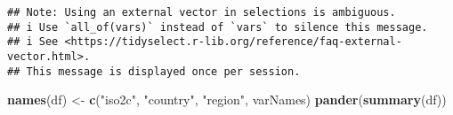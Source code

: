 \documentclass[
]{article}
\newenvironment{Shaded}{\begin{snugshade}}{\end{snugshade}}
\newcommand{\DataTypeTok}[1]{\textcolor[rgb]{0.13,0.29,0.53}{#1}}
\newcommand{\KeywordTok}[1]{\textcolor[rgb]{0.13,0.29,0.53}{\textbf{#1}}}
\newcommand{\NormalTok}[1]{#1}
\newcommand{\OperatorTok}[1]{\textcolor[rgb]{0.81,0.36,0.00}{\textbf{#1}}}
\newcommand{\OtherTok}[1]{\textcolor[rgb]{0.56,0.35,0.01}{#1}}
\newcommand{\StringTok}[1]{\textcolor[rgb]{0.31,0.60,0.02}{#1}}
\begin{document}
\begin{Shaded}
\end{Shaded}

\begin{verbatim}
## Note: Using an external vector in selections is ambiguous.
## i Use `all_of(vars)` instead of `vars` to silence this message.
## i See <https://tidyselect.r-lib.org/reference/faq-external-vector.html>.
## This message is displayed once per session.
\end{verbatim}

\begin{Shaded}
\begin{Highlighting}[]
\KeywordTok{names}\NormalTok{(df) <-}\StringTok{ }\KeywordTok{c}\NormalTok{(}\StringTok{"iso2c"}\NormalTok{, }\StringTok{"country"}\NormalTok{, }\StringTok{"region"}\NormalTok{, varNames)}
\KeywordTok{pander}\NormalTok{(}\KeywordTok{summary}\NormalTok{(df))}
\end{Highlighting}
\end{Shaded}
\end{document}
